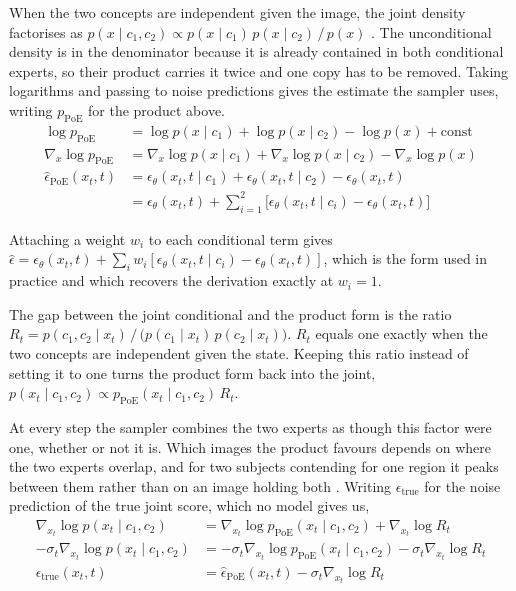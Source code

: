 \documentclass{article} %
\begin{document}
When the two concepts are independent given the image, the joint density factorises as $p(x \mid c_1, c_2) \propto p(x \mid c_1)\, p(x \mid c_2)\,/\,p(x)$ \citep{liu2022compositional}. The unconditional density is in the denominator because it is already contained in both conditional experts, so their product carries it twice and one copy has to be removed. Taking logarithms and passing to noise predictions gives the estimate the sampler uses, writing $p_{\mathrm{PoE}}$ for the product above.
\begin{align}
\log p_{\mathrm{PoE}}
  &= \log p(x \mid c_1) + \log p(x \mid c_2) - \log p(x) + \text{const} \\
\nabla_x \log p_{\mathrm{PoE}}
  &= \nabla_x \log p(x \mid c_1) + \nabla_x \log p(x \mid c_2) - \nabla_x \log p(x) \\
\hat\epsilon_{\mathrm{PoE}}(x_t, t)
  &= \epsilon_\theta(x_t, t \mid c_1) + \epsilon_\theta(x_t, t \mid c_2) - \epsilon_\theta(x_t, t) \\
  &= \epsilon_\theta(x_t, t) + \sum_{i=1}^{2}
     \big[ \epsilon_\theta(x_t, t \mid c_i) - \epsilon_\theta(x_t, t) \big]
\end{align}

Attaching a weight $w_i$ to each conditional term gives $\hat\epsilon = \epsilon_\theta(x_t,t) + \sum_i w_i[\epsilon_\theta(x_t,t \mid c_i) - \epsilon_\theta(x_t,t)]$, which is the form used in practice \citep[equation 11]{liu2022compositional} and which recovers the derivation exactly at $w_i = 1$.

The gap between the joint conditional and the product form is the ratio $R_t = p(c_1, c_2 \mid x_t)\,/\,\big(p(c_1 \mid x_t)\, p(c_2 \mid x_t)\big)$. $R_t$ equals one exactly when the two concepts are independent given the state. Keeping this ratio instead of setting it to one turns the product form back into the joint, $p(x_t \mid c_1, c_2) \propto p_{\mathrm{PoE}}(x_t \mid c_1, c_2)\, R_t$.

At every step the sampler combines the two experts as though this factor were one, whether or not it is. Which images the product favours depends on where the two experts overlap, and for two subjects contending for one region it peaks between them rather than on an image holding both \citep{bradley2025mechanisms, dutta2026steer}. Writing $\epsilon_{\text{true}}$ for the noise prediction of the true joint score, which no model gives us,
\begin{align}
\nabla_{x_t} \log p(x_t \mid c_1, c_2)
  &= \nabla_{x_t} \log p_{\mathrm{PoE}}(x_t \mid c_1, c_2) + \nabla_{x_t} \log R_t \\
-\sigma_t \nabla_{x_t} \log p(x_t \mid c_1, c_2)
  &= -\sigma_t \nabla_{x_t} \log p_{\mathrm{PoE}}(x_t \mid c_1, c_2) - \sigma_t \nabla_{x_t} \log R_t \\
\epsilon_{\text{true}}(x_t, t)
  &= \hat\epsilon_{\mathrm{PoE}}(x_t, t) - \sigma_t \nabla_{x_t} \log R_t
\end{align}
\end{document}
